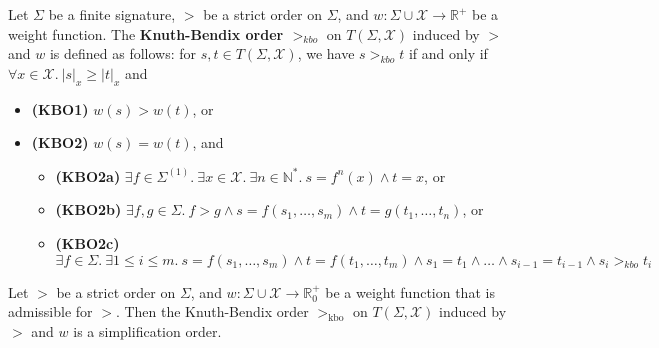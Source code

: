     \begin{definition}
    Let $\Sigma$ be a finite signature, $>$ be a strict order on $\Sigma$, and $w: \Sigma \cup \mathcal{X} \rightarrow \mathbb{R}^+$ be a weight function. The \textbf{Knuth-Bendix order $>_{kbo}$} on $T(\Sigma,\mathcal{X})$ induced by $>$ and $w$ is defined as follows: for $s, t \in T(\Sigma,\mathcal{X})$, we have \( s >_{kbo} t \) if and only if $\forall x \in \mathcal{X}.\ |s|_x \ge |t|_x$ and
    \begin{itemize}
        \item \textbf{(KBO1)} $w(s) > w(t)$, or
        \item \textbf{(KBO2)} $w(s) = w(t)$, and
        \begin{itemize}
            \item \textbf{(KBO2a)} $\exists f \in \Sigma^{(1)}.\ \exists x \in \mathcal{X}.\ \exists n \in \mathbb{N}^*.\ s = f^n(x) \land t = x$, or
            \item \textbf{(KBO2b)} $\exists f, g \in \Sigma.\ f > g \land s = f(s_1, \ldots, s_m) \land t = g(t_1, \ldots, t_n)$, or
            \item \textbf{(KBO2c)} $\exists f \in \Sigma.\ \exists 1 \le i \le m.\ s = f(s_1, \ldots, s_m) \land t = f(t_1, \ldots, t_m) \land s_1 = t_1 \land \ldots \land s_{i-1} = t_{i-1} \land s_i >_{kbo} t_i$
        \end{itemize}
    \end{itemize}
    \end{definition}
    
\begin{theorem}
Let $>$ be a strict order on $\Sigma$, and $w : \Sigma \cup \mathcal{X} \rightarrow \mathbb{R}^+_0$ be a weight function that is admissible for $>$. Then the Knuth-Bendix order $>_{\text{kbo}}$ on $T(\Sigma, \mathcal{X})$ induced by $>$ and $w$ is a simplification order.
\end{theorem}